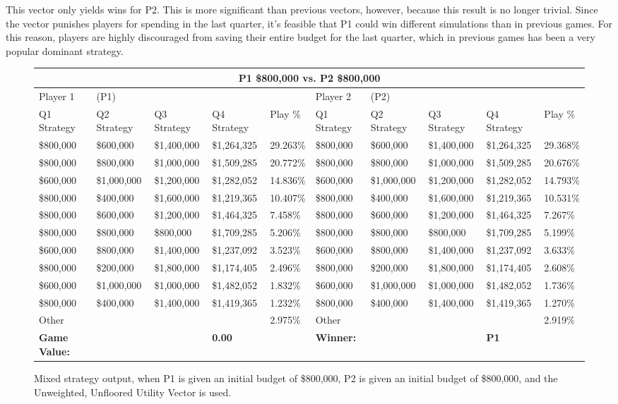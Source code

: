 \documentclass[11pt]{article}
\begin{document}
This vector only yields wins for P2. This is more significant than previous vectors, however, because this result is no longer trivial. Since the vector punishes players for spending in the last quarter, it's feasible that P1 could win different simulations than in previous games. For this reason, players are highly discouraged from saving their entire budget for the last quarter, which in previous games has been a very popular dominant strategy.

\begin{figure}
\tiny
\begin{tabular}{ |p{1.0cm}p{1.0cm}p{1.0cm}p{2.0cm}|p{1.0cm}||p{1.0cm}p{1.0cm}p{1.0cm}p{2.0cm}|p{1.0cm}|}
\hline
\multicolumn{10}{|c|}{P1 \$800,000 vs. P2 \$800,000} \\
\hline
Player 1 & (P1) & & & & Player 2 & (P2) & & & \\
\hline
Q1 Strategy & Q2 Strategy & Q3 Strategy & Q4 Strategy  &  Play \% & Q1 Strategy & Q2 Strategy & Q3 Strategy & Q4 Strategy  &  Play \%\\
\hline
\$800,000 & \$600,000 & \$1,400,000 & \$1,264,325 & 29.263\% & \$800,000 & \$600,000 & \$1,400,000 & \$1,264,325 & 29.368\% \\
\$800,000 & \$800,000 & \$1,000,000 & \$1,509,285 & 20.772\% & \$800,000 & \$800,000 & \$1,000,000 & \$1,509,285 & 20.676\% \\
\$600,000 & \$1,000,000 & \$1,200,000 & \$1,282,052 & 14.836\% & \$600,000 & \$1,000,000 & \$1,200,000 & \$1,282,052 & 14.793\% \\
\$800,000 & \$400,000 & \$1,600,000 & \$1,219,365 & 10.407\% & \$800,000 & \$400,000 & \$1,600,000 & \$1,219,365 & 10.531\% \\
\$800,000 & \$600,000 & \$1,200,000 & \$1,464,325 & 7.458\% & \$800,000 & \$600,000 & \$1,200,000 & \$1,464,325 & 7.267\% \\
\$800,000 & \$800,000 & \$800,000 & \$1,709,285 & 5.206\% & \$800,000 & \$800,000 & \$800,000 & \$1,709,285 & 5.199\% \\
\$600,000 & \$800,000 & \$1,400,000 & \$1,237,092 & 3.523\% & \$600,000 & \$800,000 & \$1,400,000 & \$1,237,092 & 3.633\% \\
\$800,000 & \$200,000 & \$1,800,000 & \$1,174,405 & 2.496\% & \$800,000 & \$200,000 & \$1,800,000 & \$1,174,405 & 2.608\% \\
\$600,000 & \$1,000,000 & \$1,000,000 & \$1,482,052 & 1.832\% & \$600,000 & \$1,000,000 & \$1,000,000 & \$1,482,052 & 1.736\% \\
\$800,000 & \$400,000 & \$1,400,000 & \$1,419,365 & 1.232\% & \$800,000 & \$400,000 & \$1,400,000 & \$1,419,365 & 1.270\% \\
\hline
Other& & & & 2.975\% & Other& & & & 2.919\% \\
\hline
\small \textbf{Game Value:} &&& \small \textbf{0.00} && \small \textbf{Winner:} &&& \small \textbf{P1}&\\
\hline
\end{tabular}
\caption{Mixed strategy output, when P1 is given an initial budget of \$800,000, P2 is given an initial budget of \$800,000, and the Unweighted, Unfloored Utility Vector is used.}
\label{8v8table.4}
\end{figure}
\end{document}
